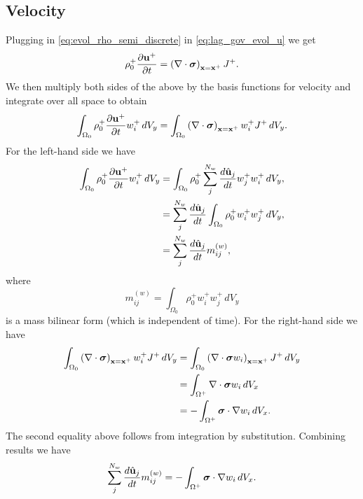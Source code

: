 \documentclass[11pt]{report}
\begin{document}
\subsection{Velocity}
Plugging in \cref{eq:evol_rho_semi_discrete} in \cref{eq:lag_gov_evol_u} we get
\begin{equation}
    \rho^+_0 \frac{\partial \mathbf{u}^+}{\partial t} = \left ( \nabla \cdot \bm \sigma \right )_{\mathbf{x} = \mathbf{x}^+} J^+.
\end{equation}
We then multiply both sides of the above by the basis functions for velocity and integrate over all space to obtain
\begin{equation}
    \int_{\Omega_0} \rho^+_0 \frac{\partial \mathbf{u}^+}{\partial t} w^+_i \, dV_y = \int_{\Omega_0} \left ( \nabla \cdot \bm \sigma \right )_{\mathbf{x} = \mathbf{x}^+} w^+_i J^+ \, dV_y.
\end{equation}
For the left-hand side we have
\begin{align}
    \int_{\Omega_0} \rho^+_0 \frac{\partial \mathbf{u}^+}{\partial t} w^+_i \, dV_y &= \int_{\Omega_0} \rho^+_0 \sum_j^{N_w} \frac{d \hat{\mathbf{u}}_j}{dt} w^+_j w^+_i \, dV_y, \nonumber \\
    &= \sum_j^{N_w} \frac{d \hat{\mathbf{u}}_j}{dt} \int_{\Omega_0} \rho^+_0 w^+_i w^+_j \, dV_y, \nonumber \\
    &= \sum_j^{N_w} \frac{d \hat{\mathbf{u}}_j}{dt} m_{ij}^{(w)},
\end{align}
where
\begin{equation}
    m_{ij}^{(w)} = \int_{\Omega_0} \rho^+_0 w^+_i w^+_j \, dV_y
\end{equation}
is a mass bilinear form (which is independent of time). For the right-hand side we have
\begin{align}
    \int_{\Omega_0} \left ( \nabla \cdot \bm \sigma \right )_{\mathbf{x} = \mathbf{x}^+} w^+_i J^+ \, dV_y & = \int_{\Omega_0} \left ( \nabla \cdot \bm \sigma w_i \right )_{\mathbf{x} = \mathbf{x}^+} J^+ \, dV_y \nonumber \\
    & = \int_{\Omega^+} \nabla \cdot \bm \sigma w_i \, dV_x \nonumber \\
    & = -\int_{\Omega^+} \bm \sigma \cdot \nabla w_i \, dV_x.
\end{align}
The second equality above follows from integration by substitution. Combining results we have
\begin{equation}
    \label{eq:evol_u_semi_discrete}
    \sum_j^{N_w} \frac{d \hat{\mathbf{u}}_j}{d t} m^{(w)}_{ij} = -\int_{\Omega^+} \bm \sigma \cdot \nabla w_i \, dV_x.
\end{equation}
\end{document}
